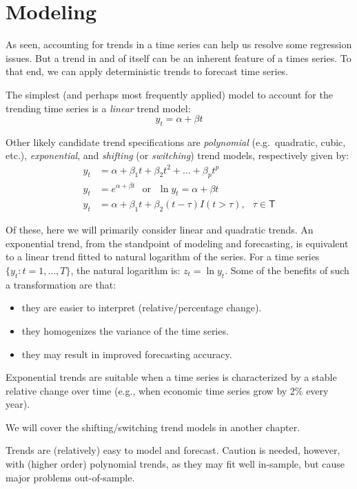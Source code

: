 \documentclass[
  oneside]{book}
\providecommand{\tightlist}{%
  \setlength{\itemsep}{0pt}\setlength{\parskip}{0pt}}
\begin{document}
\hypertarget{modeling}{%
\section{Modeling}\label{modeling}}

As seen, accounting for trends in a time series can help us resolve some regression issues. But a trend in and of itself can be an inherent feature of a times series. To that end, we can apply deterministic trends to forecast time series.

The simplest (and perhaps most frequently applied) model to account for the trending time series is a \emph{linear} trend model: \[y_t = \alpha + \beta t\]

Other likely candidate trend specifications are \emph{polynomial} (e.g.~quadratic, cubic, etc.), \emph{exponential}, and \emph{shifting} (or \emph{switching}) trend models, respectively given by:
\[\begin{aligned}
    y_t &= \alpha + \beta_1 t + \beta_2 t^2 + \ldots + \beta_p t^p \\
    y_t &= e^{\alpha + \beta t}\;~~\mbox{or}\;~~\ln{y_t} = \alpha + \beta t \\
    y_t &= \alpha + \beta_1 t + \beta_2 (t-\tau)I(t>\tau),\;~~\tau\in\mathsf{T} 
    \end{aligned}\]

Of these, here we will primarily consider linear and quadratic trends. An exponential trend, from the standpoint of modeling and forecasting, is equivalent to a linear trend fitted to natural logarithm of the series. For a time series \(\{y_t: t=1,\ldots,T\}\), the natural logarithm is: \(z_t = \ln{y_t}\). Some of the benefits of such a transformation are that:

\begin{itemize}
\tightlist
\item
  they are easier to interpret (relative/percentage change).
\item
  they homogenizes the variance of the time series.
\item
  they may result in improved forecasting accuracy.
\end{itemize}

Exponential trends are suitable when a time series is characterized by a stable relative change over time (e.g., when economic time series grow by 2\% every year).

We will cover the shifting/switching trend models in another chapter.

Trends are (relatively) easy to model and forecast. Caution is needed, however, with (higher order) polynomial trends, as they may fit well in-sample, but cause major problems out-of-sample.
\end{document}
